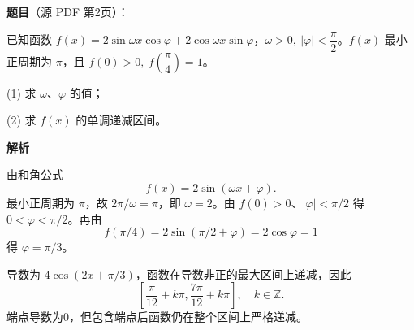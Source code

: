 \begin{answer}

\textbf{题目}（源 PDF 第2页）：

已知函数 \(f(x)=2\sin\omega x\cos\varphi+2\cos\omega x\sin\varphi\)，\(\omega>0,\ \lvert\varphi\rvert<\dfrac{\pi}{2}\)。\(f(x)\) 最小正周期为 \(\pi\)，且 \(f(0)>0,\ f\left(\dfrac{\pi}{4}\right)=1\)。

(1) 求 \(\omega\text{、}\varphi\) 的值；

(2) 求 \(f(x)\) 的单调递减区间。

\textbf{解析}


由和角公式
\nopagebreak[4]
\[
f(x)=2\sin(\omega x+\varphi).
\]
最小正周期为 \(\pi\)，故 \(2\pi/\omega=\pi\)，即 \(\omega=2\)。由 \(f(0)>0\)、\(|\varphi|<\pi/2\) 得 \(0<\varphi<\pi/2\)。再由
\nopagebreak[4]
\[
f(\pi/4)=2\sin(\pi/2+\varphi)=2\cos\varphi=1
\]
得 \(\varphi=\pi/3\)。


导数为 \(4\cos(2x+\pi/3)\)，函数在导数非正的最大区间上递减，因此
\nopagebreak[4]
\[
\left[\frac\pi{12}+k\pi,\frac{7\pi}{12}+k\pi\right],\quad k\in\mathbb Z.
\]
端点导数为0，但包含端点后函数仍在整个区间上严格递减。



\end{answer}
